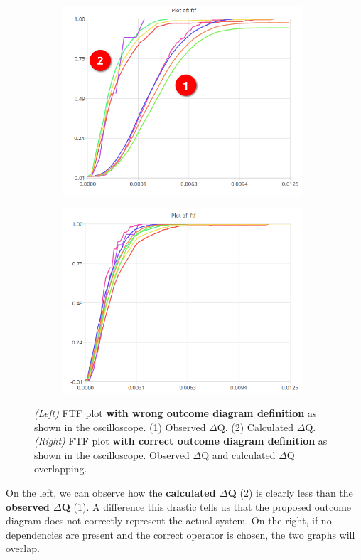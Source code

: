         \begin{figure}[H]
            \centering
            \begin{subfigure}{.5\textwidth}
                \centering
                \includegraphics[width =0.98\textwidth]{img/bad2.png}
                \label{fig:bad}
            \end{subfigure}%
            \begin{subfigure}{.5\textwidth}%
                \centering%
                \includegraphics[width =0.98\textwidth]{img/good.png}%
                \label{fig:good}%
            \end{subfigure}%
            \caption{\textit{(Left)} FTF plot \textbf{with wrong outcome diagram definition} as shown in the oscilloscope. (1) Observed $\Delta$Q. (2) Calculated $\Delta$Q. \\
            \textit{(Right)} FTF plot \textbf{with correct outcome diagram definition} as shown in the oscilloscope. Observed $\Delta$Q and calculated $\Delta$Q overlapping.}
            \label{fig:ftf_osc}%
        \end{figure}%
    On the left, we can observe how the \textbf{calculated $\Delta$Q} (2) is clearly less than the \textbf{observed $\Delta$Q} (1). A difference this drastic tells us that the proposed outcome diagram does not correctly represent the actual system. On the right, if no dependencies are present and the correct operator is chosen, the two graphs will overlap.
